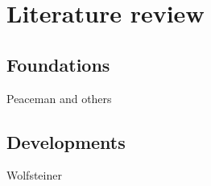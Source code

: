
\section{Literature review} %
\label{sec:literature_review}

\subsection{Foundations} %
\label{sub:foundations}
Peaceman and others

\subsection{Developments} %
\label{sub:developments}
Wolfsteiner

